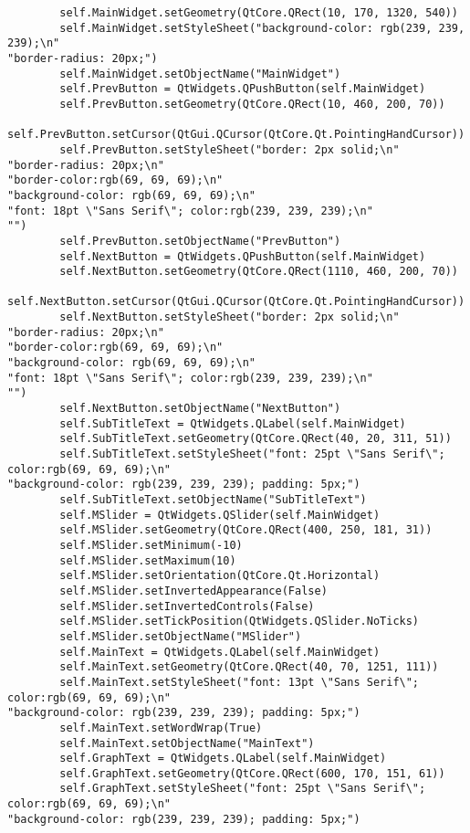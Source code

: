 \documentclass{article}
\begin{document}
\begin{lstlisting}
        self.MainWidget.setGeometry(QtCore.QRect(10, 170, 1320, 540))
        self.MainWidget.setStyleSheet("background-color: rgb(239, 239, 239);\n"
"border-radius: 20px;")
        self.MainWidget.setObjectName("MainWidget")
        self.PrevButton = QtWidgets.QPushButton(self.MainWidget)
        self.PrevButton.setGeometry(QtCore.QRect(10, 460, 200, 70))
        self.PrevButton.setCursor(QtGui.QCursor(QtCore.Qt.PointingHandCursor))
        self.PrevButton.setStyleSheet("border: 2px solid;\n"
"border-radius: 20px;\n"
"border-color:rgb(69, 69, 69);\n"
"background-color: rgb(69, 69, 69);\n"
"font: 18pt \"Sans Serif\"; color:rgb(239, 239, 239);\n"
"")
        self.PrevButton.setObjectName("PrevButton")
        self.NextButton = QtWidgets.QPushButton(self.MainWidget)
        self.NextButton.setGeometry(QtCore.QRect(1110, 460, 200, 70))
        self.NextButton.setCursor(QtGui.QCursor(QtCore.Qt.PointingHandCursor))
        self.NextButton.setStyleSheet("border: 2px solid;\n"
"border-radius: 20px;\n"
"border-color:rgb(69, 69, 69);\n"
"background-color: rgb(69, 69, 69);\n"
"font: 18pt \"Sans Serif\"; color:rgb(239, 239, 239);\n"
"")
        self.NextButton.setObjectName("NextButton")
        self.SubTitleText = QtWidgets.QLabel(self.MainWidget)
        self.SubTitleText.setGeometry(QtCore.QRect(40, 20, 311, 51))
        self.SubTitleText.setStyleSheet("font: 25pt \"Sans Serif\"; color:rgb(69, 69, 69);\n"
"background-color: rgb(239, 239, 239); padding: 5px;")
        self.SubTitleText.setObjectName("SubTitleText")
        self.MSlider = QtWidgets.QSlider(self.MainWidget)
        self.MSlider.setGeometry(QtCore.QRect(400, 250, 181, 31))
        self.MSlider.setMinimum(-10)
        self.MSlider.setMaximum(10)
        self.MSlider.setOrientation(QtCore.Qt.Horizontal)
        self.MSlider.setInvertedAppearance(False)
        self.MSlider.setInvertedControls(False)
        self.MSlider.setTickPosition(QtWidgets.QSlider.NoTicks)
        self.MSlider.setObjectName("MSlider")
        self.MainText = QtWidgets.QLabel(self.MainWidget)
        self.MainText.setGeometry(QtCore.QRect(40, 70, 1251, 111))
        self.MainText.setStyleSheet("font: 13pt \"Sans Serif\"; color:rgb(69, 69, 69);\n"
"background-color: rgb(239, 239, 239); padding: 5px;")
        self.MainText.setWordWrap(True)
        self.MainText.setObjectName("MainText")
        self.GraphText = QtWidgets.QLabel(self.MainWidget)
        self.GraphText.setGeometry(QtCore.QRect(600, 170, 151, 61))
        self.GraphText.setStyleSheet("font: 25pt \"Sans Serif\"; color:rgb(69, 69, 69);\n"
"background-color: rgb(239, 239, 239); padding: 5px;")

\end{lstlisting}
\end{document}
